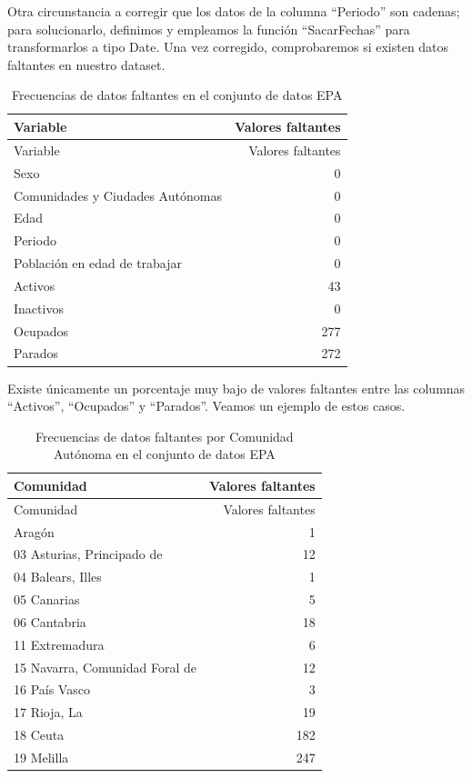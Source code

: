 \documentclass[Universitat de
València,article,submit,moreauthors,pdftex]{Definitions/mdpi}
\begin{document}
Otra circunstancia a corregir que los datos de la columna ``Periodo''
son cadenas; para solucionarlo, definimos y empleamos la función
``SacarFechas'' para transformarlos a tipo Date. Una vez corregido,
comprobaremos si existen datos faltantes en nuestro dataset.

\begin{longtable}[]{@{}lr@{}}
\caption{Frecuencias de datos faltantes en el conjunto de datos
EPA}\tabularnewline
\toprule\noalign{}
Variable & Valores faltantes \\
\midrule\noalign{}
\endfirsthead
\toprule\noalign{}
Variable & Valores faltantes \\
\midrule\noalign{}
\endhead
\bottomrule\noalign{}
\endlastfoot
Sexo & 0 \\
Comunidades y Ciudades Autónomas & 0 \\
Edad & 0 \\
Periodo & 0 \\
Población en edad de trabajar & 0 \\
Activos & 43 \\
Inactivos & 0 \\
Ocupados & 277 \\
Parados & 272 \\
\end{longtable}

Existe únicamente un porcentaje muy bajo de valores faltantes entre las
columnas ``Activos'', ``Ocupados'' y ``Parados''. Veamos un ejemplo de
estos casos.

\begin{longtable}[]{@{}lr@{}}
\caption{Frecuencias de datos faltantes por Comunidad Autónoma en el
conjunto de datos EPA}\tabularnewline
\toprule\noalign{}
Comunidad & Valores faltantes \\
\midrule\noalign{}
\endfirsthead
\toprule\noalign{}
Comunidad & Valores faltantes \\
\midrule\noalign{}
\endhead
\bottomrule\noalign{}
\endlastfoot
02 Aragón & 1 \\
03 Asturias, Principado de & 12 \\
04 Balears, Illes & 1 \\
05 Canarias & 5 \\
06 Cantabria & 18 \\
11 Extremadura & 6 \\
15 Navarra, Comunidad Foral de & 12 \\
16 País Vasco & 3 \\
17 Rioja, La & 19 \\
18 Ceuta & 182 \\
19 Melilla & 247 \\
\end{longtable}
\end{document}
